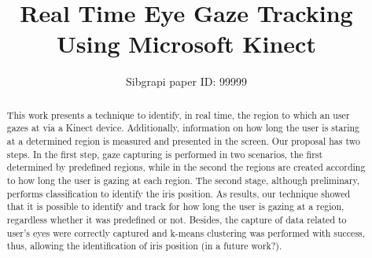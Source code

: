\documentclass[10pt, conference]{IEEEtran}
\begin{document}
%
\title{Real Time Eye Gaze Tracking Using Microsoft Kinect}

\newif\iffinal
\finalfalse
\newcommand{\jemsid}{99999}


\iffinal
  \author{%
    \IEEEauthorblockN{Raul Benites Paradeda}
    \IEEEauthorblockA{%
      INESC-ID \& Instituto Superior T\'{e}cnico\\
      University of Lisbon\\
      Lisbon, Portugal\\
      Email: \href{mailto:raul.paradeda@tecnico.ulisboa.pt}{raul.paradeda@tecnico.ulisboa.pt}}
  \and
    \IEEEauthorblockN{Jones Granatyr, Jean Paul Barddal}
    \IEEEauthorblockA{%
      Graduate Program in Informatics (PPGIa)\\
      Pontif\'{i}cia Universidade Cat\'{o}lica do Paran\'{a} (PUCPR)\\
      Curitiba, Brazil\\
      Email:  \href{mailto:jones.granatyr@pucpr.edu.br}{jones.granatyr@pucpr.edu.br}, \href{mailto:jean.barddal@ppgia.pucpr.br}{jean.barddal@ppgia.pucpr.br}}
  }
\else
  \author{Sibgrapi paper ID: \jemsid \\ }
\fi

\maketitle


\begin{abstract}
	This work presents a technique to identify, in real time, the region to which an user gazes at via a Kinect device.
	Additionally, information on how long the user is staring at a determined region is measured and presented in the screen.
	Our proposal has two steps.
	In the first step, gaze capturing is performed in two scenarios, the first determined by predefined regions, while in the second the regions are created according to how long the user is gazing at each region.
	The second stage, although preliminary, performs classification to identify the iris position.
	As results, our technique showed that it is possible to identify and track for how long the user is gazing at a region, regardless whether it was predefined or not.
	Besides, the capture of data related to user's eyes were correctly captured and k-means clustering was performed with success, thus, allowing the identification of iris position (in a future work?).
\end{abstract}
\end{document}
